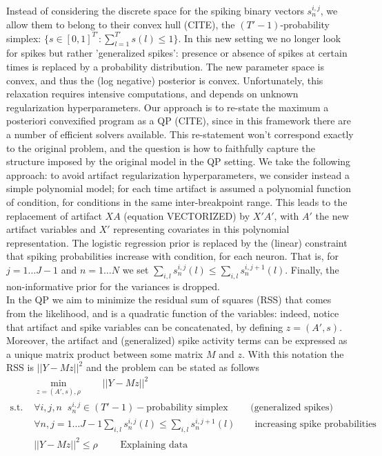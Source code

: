 \documentclass[12pt,letterpaper,fleqn]{article}
\begin{document}
Instead of considering the discrete space for the spiking binary vectors $s_n^{i,j}$, we allow them to belong to their convex hull (CITE), the  $(T'-1)$-probability simplex: $\{ s\in [0,1]^{T'}:  \sum_{l=1}^{T'} s(l)\leq 1\}$. In this new setting we no longer look for spikes but rather 'generalized spikes': presence or absence of spikes at certain times is replaced by a probability distribution. The new parameter space is convex, and thus the (log negative) posterior is convex. Unfortunately, this relaxation requires  intensive computations, and depends on unknown regularization hyperparameters. Our approach is to re-state the maximum a posteriori convexified program as a QP (CITE), since in this framework there are a number of efficient solvers available. This re-statement won't correspond exactly to the original problem, and the question is how to faithfully capture the structure imposed by the original model in the QP setting. We take the following approach: to avoid artifact regularization hyperparameters, we consider instead a simple polynomial model; for each time artifact is assumed a polynomial function of condition, for conditions in the same inter-breakpoint range. This leads to the replacement of artifact  $XA$ (equation VECTORIZED) by $X'A'$, with $A'$ the new artifact variables and $X'$ representing covariates in this polynomial representation. The logistic regression prior is replaced by the (linear) constraint that spiking probabilities increase with condition, for each neuron. That is, for $j=1\ldots J-1$ and $n=1\ldots N$ we set $\sum_{i,l}s_n^{i,j}(l) \leq \sum_{i,l}s_n^{i,j+1}(l)$. Finally, the non-informative prior for the variances is dropped.\\
In the QP we aim to minimize the residual sum of squares (RSS) that comes from the likelihood, and is a quadratic function of the variables: indeed, notice that artifact and spike variables can be concatenated, by defining $z=(A',s)$. Moreover, the artifact and (generalized) spike activity terms can be expressed as a unique matrix product between some matrix $M$ and $z$. With this notation the RSS is $||Y-Mz||^2$ and the problem can be stated as follows
  \begin{eqnarray}& \displaystyle{\min_{z=(A',s),\rho}\quad \quad  ||Y-Mz||^2} \\ \nonumber
  \text{s.t. } &  \forall i,j,n \;\; s_n^{i,j}\in (T'-1)-\text{probability simplex }\quad\quad \text{(generalized spikes)}\\ \nonumber
  & \forall n, j=1\ldots J-1\sum_{i,l}s_n^{i,j}(l) \leq \sum_{i,l}s_n^{i,j+1}(l)\quad \quad \text{increasing spike probabilities}\\ \nonumber 
  & ||Y-Mz||^2\leq \rho \quad \quad \text{ Explaining data} \\ \nonumber
\end{eqnarray}
\end{document}
